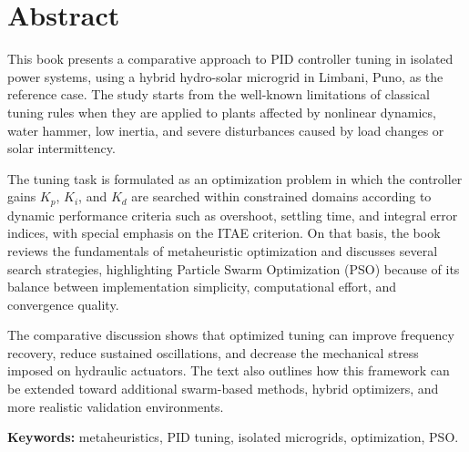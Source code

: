 \chapter*{Abstract}

This book presents a comparative approach to PID controller tuning in isolated power
systems, using a hybrid hydro-solar microgrid in Limbani, Puno, as the reference case.
The study starts from the well-known limitations of classical tuning rules when they are
applied to plants affected by nonlinear dynamics, water hammer, low inertia, and severe
disturbances caused by load changes or solar intermittency.

The tuning task is formulated as an optimization problem in which the controller gains
$K_p$, $K_i$, and $K_d$ are searched within constrained domains according to dynamic
performance criteria such as overshoot, settling time, and integral error indices, with
special emphasis on the ITAE criterion. On that basis, the book reviews the fundamentals
of metaheuristic optimization and discusses several search strategies, highlighting Particle
Swarm Optimization (PSO) because of its balance between implementation simplicity,
computational effort, and convergence quality.

The comparative discussion shows that optimized tuning can improve frequency recovery,
reduce sustained oscillations, and decrease the mechanical stress imposed on hydraulic
actuators. The text also outlines how this framework can be extended toward additional
swarm-based methods, hybrid optimizers, and more realistic validation environments.

\bigskip
\noindent\textbf{Keywords:} metaheuristics, PID tuning, isolated microgrids, optimization, PSO.
